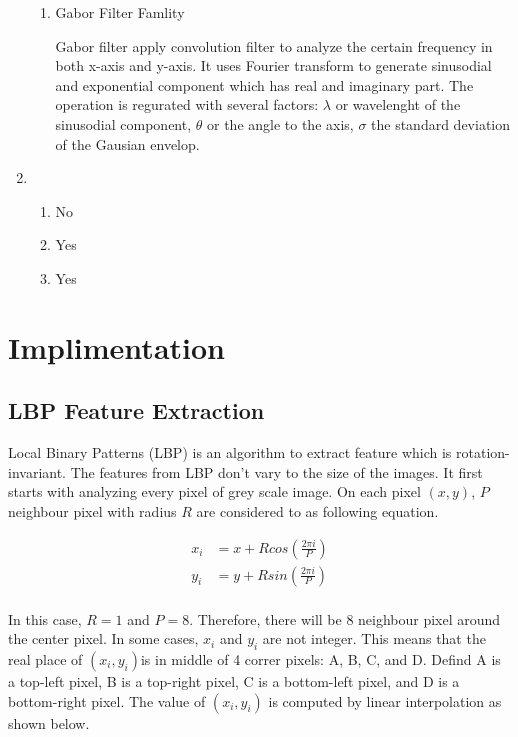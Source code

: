 \documentclass[11pt]{article}
\begin{document}
\begin{enumerate}
\begin{enumerate}
\item Gabor Filter Famlity

Gabor filter apply convolution filter to analyze the certain frequency in both x-axis and y-axis. It uses Fourier transform to generate sinusodial and exponential component which has real and imaginary part. The operation is regurated with several factors: $\lambda$ or wavelenght of the sinusodial component, $\theta$ or the angle to the axis, $\sigma$ the standard deviation of the Gausian envelop.

\end{enumerate}

\item 

\begin{enumerate}
\item No

\item Yes

\item Yes

\end{enumerate}

\end{enumerate}


\section*{Implimentation}


\subsection*{LBP Feature Extraction}

Local Binary Patterns (LBP) is an algorithm to extract feature which is rotation-invariant. The features from LBP don't vary to the size of the images. It first starts with analyzing every pixel of grey scale image. On each pixel $(x,y)$, $P$ neighbour pixel with radius $R$ are considered to as following equation.


\begin{align*}
x_i &= x + Rcos(\frac{2\pi i}{P}) \\
y_i &= y + Rsin(\frac{2\pi i}{P}) \\
\end{align*}

In this case, $R = 1$ and $P = 8$. Therefore, there will be 8 neighbour pixel around the center pixel. In some cases, $x_i$ and $y_i$ are not integer. This means that the real place of $(x_i, y_i)$is in middle of 4 correr pixels: A, B, C, and D. Defind A is a top-left pixel, B is a top-right pixel, C is a bottom-left pixel, and D is a bottom-right pixel. The value of  $(x_i, y_i)$ is computed by linear interpolation as shown below.
\end{document}
